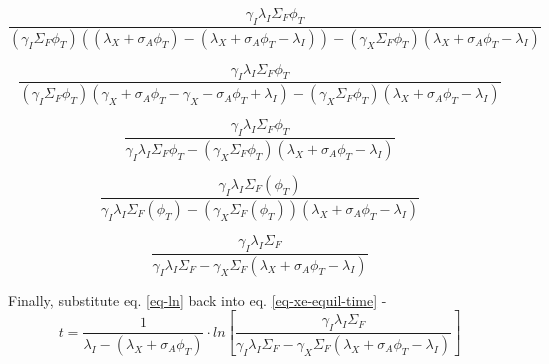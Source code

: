 \documentclass[11pt,a4paper]{article}
\begin{document}
\begin{equation}
    \frac{
        \gamma_I\lambda_I\Sigma_F\phi_T
    }
    {
        (\gamma_I\Sigma_F\phi_T)((\lambda_X+\sigma_A\phi_T) - (\lambda_X+\sigma_A\phi_T-\lambda_I))
        - (\gamma_X\Sigma_F\phi_T)(\lambda_X+\sigma_A\phi_T-\lambda_I)
    }
\end{equation}
\vspace{\baselineskip}

\begin{equation}
    \frac{
        \gamma_I\lambda_I\Sigma_F\phi_T
    }
    {
        (\gamma_I\Sigma_F\phi_T)(\gamma_X + \sigma_A\phi_T - \gamma_X - \sigma_A\phi_T + \lambda_I)
        - (\gamma_X\Sigma_F\phi_T)(\lambda_X+\sigma_A\phi_T-\lambda_I)
    }
\end{equation}
\vspace{\baselineskip}

\begin{equation}
    \frac{
        \gamma_I\lambda_I\Sigma_F\phi_T
    }
    {
        \gamma_I\lambda_I\Sigma_F\phi_T
        - (\gamma_X\Sigma_F\phi_T)(\lambda_X+\sigma_A\phi_T-\lambda_I)
    }
\end{equation}
\vspace{\baselineskip}

\begin{equation}
    \frac{
        \gamma_I\lambda_I\Sigma_F(\phi_T)
    }
    {
        \gamma_I\lambda_I\Sigma_F(\phi_T)
        - (\gamma_X\Sigma_F(\phi_T))(\lambda_X+\sigma_A\phi_T-\lambda_I)
    }
\end{equation}
\vspace{\baselineskip}

\begin{equation} \label{eq-ln}
    \frac{
        \gamma_I\lambda_I\Sigma_F
    }
    {
        \gamma_I\lambda_I\Sigma_F
        - \gamma_X\Sigma_F(\lambda_X+\sigma_A\phi_T-\lambda_I)
    }
\end{equation}
\vspace{\baselineskip}
\vspace{\baselineskip}

\noindent Finally, substitute eq. \ref{eq-ln} back into eq. \ref{eq-xe-equil-time} -  
\begin{equation} \label{eq-xe-equil-time}
    t=\frac{1}{\lambda_I-(\lambda_X+\sigma_A\phi_T)} \cdot  
    ln[    \frac{
        \gamma_I\lambda_I\Sigma_F
    }
    {
        \gamma_I\lambda_I\Sigma_F
        - \gamma_X\Sigma_F(\lambda_X+\sigma_A\phi_T-\lambda_I)
    }]
\end{equation}
\end{document}
